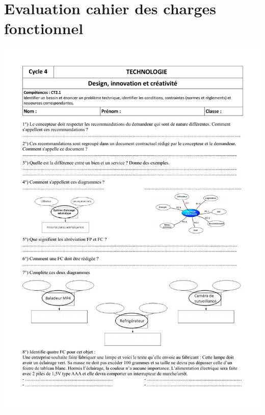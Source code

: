 \section{Evaluation cahier des charges fonctionnel}\label{annexe:evaluation_cdcf}
\includegraphics[scale=0.6]{./ressources/Controle_CDCF.pdf} 

